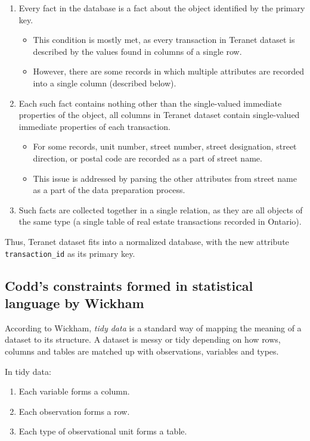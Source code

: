 \begin{enumerate}
\begin{itemize}
    \end{itemize}
    \item Every fact in the database is a fact about the object identified by the primary key.
    \begin{itemize}
        \item This condition is mostly met, as every transaction in Teranet dataset is described by the values found in columns of a single row.
        \item However, there are some records in which multiple attributes are recorded into a single column (described below).
    \end{itemize}
    \item Each such fact contains nothing other than the single-valued immediate properties of the object, all columns in Teranet dataset contain single-valued immediate properties of each transaction.
    \begin{itemize}
        \item For some records, unit number, street number, street designation, street direction, or postal code are recorded as a part of street name.
        \item This issue is addressed by parsing the other attributes from street name as a part of the data preparation process.
    \end{itemize}
    \item Such facts are collected together in a single relation, as they are all objects of the same type (a single table of real estate transactions recorded in Ontario).
\end{enumerate}

Thus, Teranet dataset fits into a normalized database, with the new attribute \texttt{transaction\_id} as its primary key.

\subsection{Codd's constraints formed in statistical language by Wickham} \label{subsec:teranet_tidy_data}

According to Wickham\cite{Wickham2014}, \textit{tidy data} is a standard way of mapping the meaning of a dataset to its structure.
A dataset is messy or tidy depending on how rows, columns and tables are matched up with observations,
variables and types.

\vspace{5mm}

In tidy data:
\begin{enumerate}
    \item Each variable forms a column.
    \item Each observation forms a row.
    \item Each type of observational unit forms a table.
\end{enumerate}

